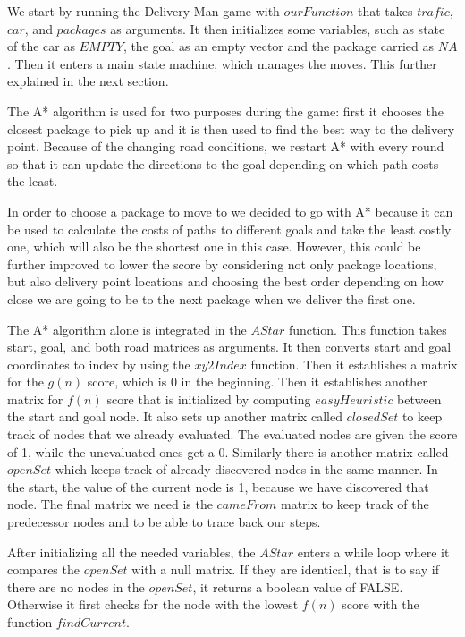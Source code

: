 \documentclass[a4paper]{article}
\begin{document}
We start by running the Delivery Man game with $ourFunction$ that takes $trafic$, $car$, and $packages$ as arguments. It then initializes some variables, such as state of the car as $EMPTY$, the goal as an empty vector and the package carried as $NA$. Then it enters a main state machine, which manages the moves. This further explained in the next section.

The A* algorithm is used for two purposes during the game: first it chooses the closest package to pick up and it is then used to find the best way to the delivery point. Because of the changing road conditions, we restart A* with every round so that it can update the directions to the goal depending on which path costs the least.

In order to choose a package to move to we decided to go with A* because it can be used to calculate the costs of paths to different goals and take the least costly one, which will also be the shortest one in this case. However, this could be further improved to lower the score by considering not only package locations, but also delivery point locations and choosing the best order depending on how close we are going to be to the next package when we deliver the first one.

The A* algorithm alone is integrated in the $AStar$ function. This function takes start, goal, and both road matrices as arguments. It then converts start and goal coordinates to index by using the $xy2Index$ function. Then it establishes a matrix for the $g(n)$ score, which is 0 in the beginning. Then it establishes another matrix for $f(n)$ score that is initialized by computing $easyHeuristic$ between the start and goal node. It also sets up another matrix called $closedSet$ to keep track of nodes that we already evaluated. The evaluated nodes are given the score of 1, while the unevaluated ones get a 0. Similarly there is another matrix called $openSet$ which keeps track of already discovered nodes in the same manner. In the start, the value of the current node is 1, because we have discovered that node. The final matrix we need is the $cameFrom$ matrix to keep track of the predecessor nodes and to be able to trace back our steps.

After initializing all the needed variables, the $AStar$ enters a while loop where it compares the $openSet$ with a null matrix. If they are identical, that is to say if there are no nodes in the $openSet$, it returns a boolean value of FALSE. Otherwise it first checks for the node with the lowest $f(n)$ score with the function $findCurrent$. 
\end{document}
